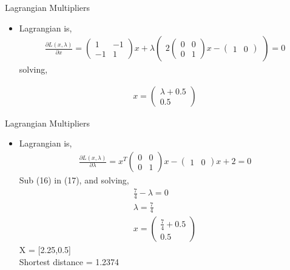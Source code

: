 \documentclass{beamer}
\begin{document}
\begin{frame}{Lagrangian Multipliers}
  \begin{itemize}
  \item {
  Lagrangian is,
 \begin{align}
 \frac{\partial L(x,\lambda)}{\partial x} = 
  \begin{pmatrix}
		1 & -1\\
		-1 & 1
		\end{pmatrix}x + \lambda
  \begin{pmatrix}
  2\begin{pmatrix}
		0 & 0\\
		0 & 1
		\end{pmatrix}x-\begin{pmatrix}
		1 & 0
		\end{pmatrix} 
	\end{pmatrix} = 0
 \end{align}
 solving,
 
 \begin{align}
 x = \begin{pmatrix}
		\lambda + 0.5\\ 0.5
		\end{pmatrix} 
 \end{align}

  }
 \end{itemize}

\end{frame}

\begin{frame}{Lagrangian Multipliers}
  \begin{itemize}
  \item {
  Lagrangian is,
 \begin{align}
 \frac{\partial L(x,\lambda)}{\partial \lambda} = x^{T}\begin{pmatrix}
		0 & 0\\
		0 & 1
		\end{pmatrix}x-\begin{pmatrix}
		1 & 0
		\end{pmatrix}x+2=0
 \end{align}
 Sub (16) in (17), and solving,
 \begin{align}
 \frac{7}{4} - \lambda = 0\\
 \lambda = \frac{7}{4}\\
  x = \begin{pmatrix}
		\frac{7}{4} + 0.5\\ 0.5
		\end{pmatrix} 
 \end{align}
X = [2.25,0.5]\\ 
Shortest distance =  1.2374\\
  }
 \end{itemize}

\end{frame}
\end{document}
